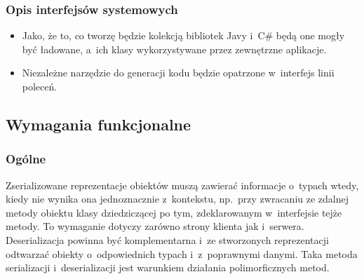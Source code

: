\subsubsection{Opis interfejsów systemowych}
\begin{itemize}
	\item Jako, że to, co tworzę będzie kolekcją bibliotek Javy i~C\# będą one mogły być ładowane, a~ich klasy wykorzystywane przez zewnętrzne aplikacje.
	\item Niezależne narzędzie do generacji kodu będzie opatrzone w~interfejs linii poleceń.
\end{itemize}


\subsection{Wymagania funkcjonalne}

\subsubsection{Ogólne}

\begin{description}
Zserializowane reprezentacje obiektów muszą zawierać informacje o~typach wtedy, kiedy nie wynika ona jednoznacznie z~kontekstu,
np.\ przy zwracaniu ze zdalnej metody obiektu klasy dziedziczącej po tym, zdeklarowanym w~interfejsie tejże metody.
To wymaganie dotyczy zarówno strony klienta jak i~serwera.
Deserializacja powinna być komplementarna i~ze stworzonych reprezentacji odtwarzać obiekty o~odpowiednich typach i~z~poprawnymi danymi.
Taka metoda serializacji i~deserializacji jest warunkiem działania polimorficznych metod.

\end{description}

